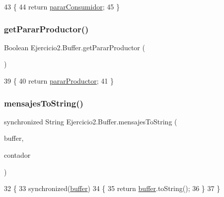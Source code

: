 \begin{DoxyCode}
43                                         \{
44         \textcolor{keywordflow}{return} \mbox{\hyperlink{class_ejercicio2_1_1_buffer_ace8c2a56a3fa5d45cf9e3d979c5f9d17}{pararConsumidor}};
45     \}
\end{DoxyCode}
\mbox{\label{class_ejercicio2_1_1_buffer_a0ee76aa61a4ad36a541c96a6863944f0}} 
\subsubsection{\texorpdfstring{get\+Parar\+Productor()}{getPararProductor()}}
{\footnotesize\ttfamily Boolean Ejercicio2.\+Buffer.\+get\+Parar\+Productor (\begin{DoxyParamCaption}{ }\end{DoxyParamCaption})\hspace{0.3cm}{\ttfamily [inline]}}


\begin{DoxyCode}
39                                        \{
40         \textcolor{keywordflow}{return} \mbox{\hyperlink{class_ejercicio2_1_1_buffer_a519b556e9529e75803b99114dbdd0eab}{pararProductor}};
41     \}
\end{DoxyCode}
\mbox{\label{class_ejercicio2_1_1_buffer_a434d7d9dfdec59f5a88a52ea67eeca01}} 
\subsubsection{\texorpdfstring{mensajes\+To\+String()}{mensajesToString()}}
{\footnotesize\ttfamily synchronized String Ejercicio2.\+Buffer.\+mensajes\+To\+String (\begin{DoxyParamCaption}\item[{Blocking\+Queue}]{buffer,  }\item[{int}]{contador }\end{DoxyParamCaption})\hspace{0.3cm}{\ttfamily [inline]}}


\begin{DoxyCode}
32     \{
33         \textcolor{keyword}{synchronized}(\mbox{\hyperlink{class_ejercicio2_1_1_buffer_a63ddce4482528c08b1023ab9ea3842ce}{buffer}})
34         \{
35         \textcolor{keywordflow}{return} \mbox{\hyperlink{class_ejercicio2_1_1_buffer_a63ddce4482528c08b1023ab9ea3842ce}{buffer}}.toString();
36         \}
37     \}
\end{DoxyCode}
\mbox{\label{class_ejercicio2_1_1_buffer_a9b87c49cad4ed9c88c5bfb48376bb8d4}} 
